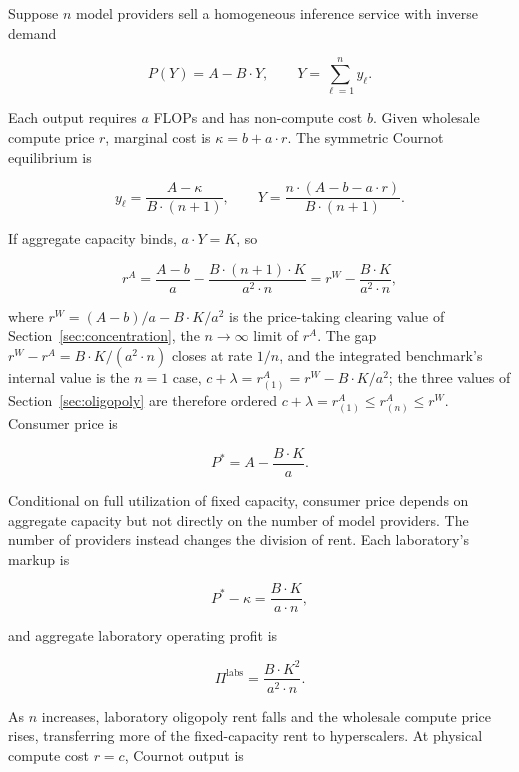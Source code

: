 \documentclass[11pt]{article}
\begin{document}
Suppose $n$ model providers sell a homogeneous inference service with inverse demand

\begin{equation}P(Y)=A-B\cdot Y,\qquad Y=\sum_{\ell=1}^{n}y_\ell.\end{equation}

Each output requires $a$ FLOPs and has non-compute cost $b$. Given wholesale compute price $r$, marginal cost is $\kappa=b+a\cdot r$. The symmetric Cournot equilibrium is

\begin{equation}y_\ell=\frac{A-\kappa}{B\cdot(n+1)},\qquad Y=\frac{n\cdot(A-b-a\cdot r)}{B\cdot(n+1)}.\end{equation}

If aggregate capacity binds, $a\cdot Y=K$, so

\begin{equation}r^A=\frac{A-b}{a}-\frac{B\cdot(n+1)\cdot K}{a^2\cdot n}=r^W-\frac{B\cdot K}{a^2\cdot n},\end{equation}

where $r^W=(A-b)/a-B\cdot K/a^2$ is the price-taking clearing value of Section~\ref{sec:concentration}, the $n\to\infty$ limit of $r^A$. The gap $r^W-r^A=B\cdot K/(a^2\cdot n)$ closes at rate $1/n$, and the integrated benchmark's internal value is the $n=1$ case, $c+\lambda=r^A_{(1)}=r^W-B\cdot K/a^2$; the three values of Section~\ref{sec:oligopoly} are therefore ordered $c+\lambda=r^A_{(1)}\leq r^A_{(n)}\leq r^W$. Consumer price is

\begin{equation}P^*=A-\frac{B\cdot K}{a}.\end{equation}

Conditional on full utilization of fixed capacity, consumer price depends on aggregate capacity but not directly on the number of model providers. The number of providers instead changes the division of rent. Each laboratory's markup is

\begin{equation}P^*-\kappa=\frac{B\cdot K}{a\cdot n},\end{equation}

and aggregate laboratory operating profit is

\begin{equation}\Pi^{\mathrm{labs}}=\frac{B\cdot K^2}{a^2\cdot n}.\end{equation}

As $n$ increases, laboratory oligopoly rent falls and the wholesale compute price rises, transferring more of the fixed-capacity rent to hyperscalers. At physical compute cost $r=c$, Cournot output is
\end{document}
